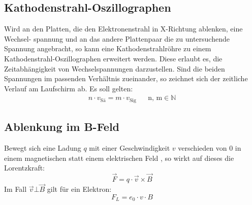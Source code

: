 \subsection{Kathodenstrahl-Oszillographen}
Wird an den Platten, die den Elektronenstrahl in X-Richtung ablenken, eine Wechsel-
spannung und an das andere Plattenpaar die zu untersuchende Spannung angebracht,
so kann eine Kathodenstrahlröhre zu einem Kathodenstrahl-Oszillographen erweitert
werden. Diese erlaubt es, die Zeitabhängigkeit von Wechselspannungen darzustellen. Sind
die beiden Spannungen im passenden Verhältnis zueinander, so zeichnet sich der zeitliche
Verlauf am Laufschirm ab. Es soll gelten:
\begin{align}
  n \cdot v_\text{Sä} = m \cdot v_\text{Sig} && \text{n, m} \in \mathds{N}
\end{align}

\subsection{ Ablenkung im B-Feld}
Bewegt sich eine Ladung $q$ mit einer Geschwindigkeit $v$ verschieden von $0$ in einem magnetischen statt einem elektrischen Feld , so wirkt auf
dieses die Lorentzkraft:
\begin{equation}
  \vec{F}=q \cdot \vec{v} \times \vec{B}
\end{equation}
Im Fall $\vec{v} \bot \vec{B}$  gilt für ein Elektron:
\begin{equation}
  F_L= e_0 \cdot v \cdot B
\end{equation}

